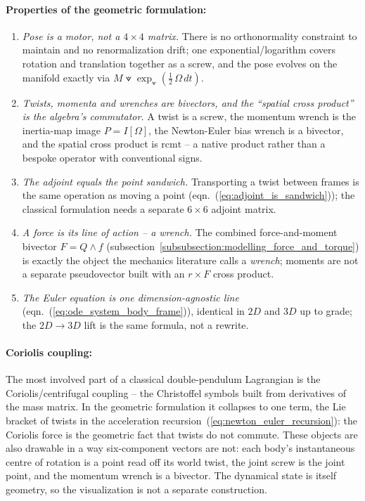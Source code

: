 \paragraph{Properties of the geometric formulation:}
\begin{enumerate}
    \item \emph{Pose is a motor, not a $4\times4$ matrix.} There is no orthonormality
          constraint to maintain and no renormalization drift; one exponential/logarithm
          covers rotation and translation together as a screw, and the pose evolves on the
          manifold exactly via $M \veedot \exp_\veedot(\tfrac12\,\Omega\,dt)$.
    \item \emph{Twists, momenta and wrenches are bivectors, and the ``spatial cross
          product'' is the algebra's commutator.} A twist is a screw, the
          momentum wrench is the inertia-map image $P = I[\Omega]$, the Newton-Euler bias
          wrench is a bivector, and the spatial cross product is $\mathrm{rcmt}$ -- a
          native product rather than a bespoke operator with conventional signs.
    \item \emph{The adjoint equals the point sandwich.} Transporting a twist between
          frames is the same operation as moving a point
          (eqn.~(\ref{eq:adjoint_is_sandwich})); the classical formulation needs a
          separate $6\times6$ adjoint matrix.
    \item \emph{A force is its line of action -- a wrench.} The combined force-and-moment
          bivector $F = Q \wedge f$
          (subsection~\ref{subsubsection:modelling_force_and_torque}) is exactly the
          object the mechanics literature calls a \emph{wrench}; moments are not a
          separate pseudovector built with an $r \times F$ cross product.
    \item \emph{The Euler equation is one dimension-agnostic line}
          (eqn.~(\ref{eq:ode_system_body_frame})), identical in $2D$ and $3D$ up to grade;
          the $2D \to 3D$ lift is the same formula, not a rewrite.
\end{enumerate}

\paragraph{Coriolis coupling:} The most involved part of a classical double-pendulum
Lagrangian is the
Coriolis/centrifugal coupling -- the Christoffel symbols built from derivatives of the
mass matrix. In the geometric formulation it collapses to one term, the Lie bracket of
twists in the acceleration recursion~(\ref{eq:newton_euler_recursion}): the Coriolis
force is the geometric fact that twists do not commute. These objects are also drawable
in a way six-component vectors are not: each body's instantaneous centre of rotation is a
point read off its world twist, the joint screw is the joint point, and the momentum
wrench is a bivector. The dynamical state is itself geometry, so the
visualization is not a separate construction.


